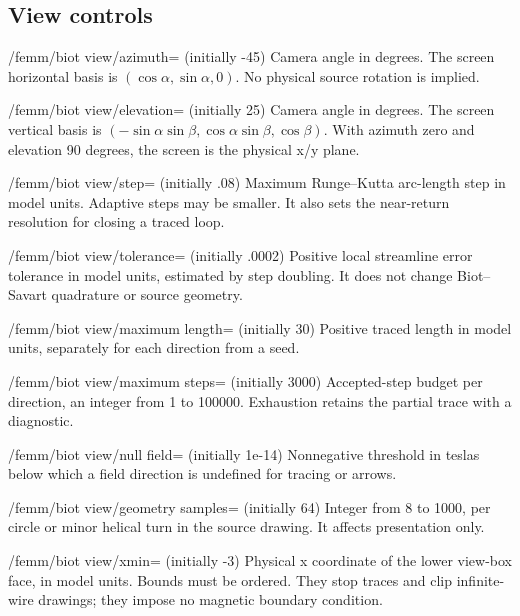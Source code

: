 \subsection{View controls}
\begin{key}{/femm/biot view/azimuth= (initially -45)}
Camera angle in degrees. The screen horizontal basis is $(\cos\alpha,\sin\alpha,0)$. No physical source rotation is implied.
\end{key}
\begin{key}{/femm/biot view/elevation= (initially 25)}
Camera angle in degrees. The screen vertical basis is $(-\sin\alpha\sin\beta,\cos\alpha\sin\beta,\cos\beta)$. With azimuth zero and elevation 90 degrees, the screen is the physical x/y plane.
\end{key}
\begin{key}{/femm/biot view/step= (initially .08)}
Maximum Runge--Kutta arc-length step in model units. Adaptive steps may be smaller. It also sets the near-return resolution for closing a traced loop.
\end{key}
\begin{key}{/femm/biot view/tolerance= (initially .0002)}
Positive local streamline error tolerance in model units, estimated by step doubling. It does not change Biot--Savart quadrature or source geometry.
\end{key}
\begin{key}{/femm/biot view/maximum length= (initially 30)}
Positive traced length in model units, separately for each direction from a seed.
\end{key}
\begin{key}{/femm/biot view/maximum steps= (initially 3000)}
Accepted-step budget per direction, an integer from 1 to 100000. Exhaustion retains the partial trace with a diagnostic.
\end{key}
\begin{key}{/femm/biot view/null field= (initially 1e-14)}
Nonnegative threshold in teslas below which a field direction is undefined for tracing or arrows.
\end{key}
\begin{key}{/femm/biot view/geometry samples= (initially 64)}
Integer from 8 to 1000, per circle or minor helical turn in the source drawing. It affects presentation only.
\end{key}
\begin{key}{/femm/biot view/xmin= (initially -3)}
Physical x coordinate of the lower view-box face, in model units. Bounds must be ordered. They stop traces and clip infinite-wire drawings; they impose no magnetic boundary condition.
\end{key}
